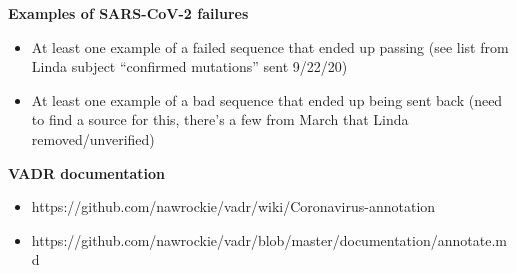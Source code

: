 \documentclass[landscape]{slides}
\begin{document}
\begin{slide}
\begin{center}
\Large{\textbf{Examples of SARS-CoV-2 failures}}
\end{center}

\begin{itemize}
\item At least one example of a failed sequence that ended up passing
  (see list from Linda subject ``confirmed mutations'' sent 9/22/20)
\item At least one example of a bad sequence that ended up being sent back
  (need to find a source for this, there's a few from March that Linda
  removed/unverified)
\end{itemize}

\vfill
\end{slide}
\begin{slide}
\begin{center}
\Large{\textbf{VADR documentation}}
\end{center}

\begin{itemize}
\item https://github.com/nawrockie/vadr/wiki/Coronavirus-annotation

\item https://github.com/nawrockie/vadr/blob/master/documentation/annotate.md  
\end{itemize}

\vfill
\end{slide}
\end{document}
